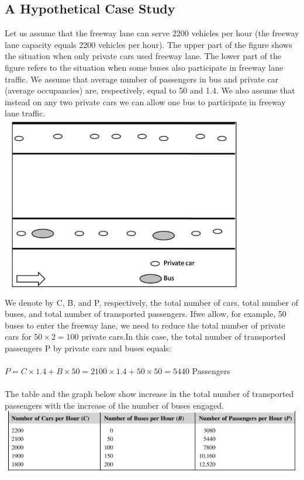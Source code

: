 \subsection{A Hypothetical Case Study}
Let us assume that the freeway lane can serve 2200 vehicles per hour (the freeway lane capacity equals 2200 vehicles per hour). The upper part of the figure shows the situation when only private cars used freeway lane. The lower part of the figure refers to the situation when some buses also participate in freeway lane traffic. We assume that average number of passengers in bus and private car (average occupancies) are, respectively, equal to 50 and 1.4. We also assume that instead on any two private cars we can allow one bus to participate in freeway lane traffic.\\
\includegraphics[scale=0.8]{gfx/fig15.png}\\
We denote by C, B, and P, respectively, the total number of cars, total number of buses, and total number of transported passengers. Ifwe allow, for example, 50 buses to enter the freeway lane, we need to reduce the total number of private cars for $ 50 \times 2 = 100$ private cars.In this case, the total number of transported passengers P by private cars and buses equals:\\\\
$ P = C \times 1.4 + B \times 50 = 2100 \times 1.4 + 50 \times 50 = 5440$ Passengers\\\\
The table and the graph below show increase in the total number of transported passengers with the increase of the number of buses engaged.\\
\includegraphics[scale=0.8]{gfx/fig16.png}\\
